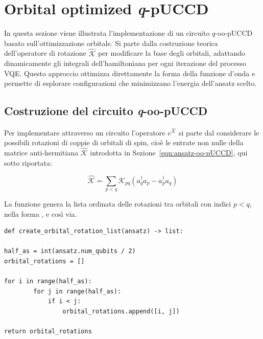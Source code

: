 \section{Orbital optimized \textit{q}-pUCCD}\label{sez:orbital-optimization}

In questa sezione viene illustrata l’implementazione di un circuito $q$-oo-pUCCD basato sull’ottimizzazione orbitale. Si parte dalla costruzione teorica dell’operatore di rotazione $\hat{\mathcal{K}}$ per modificare la base degli orbitali, adattando dinamicamente gli integrali dell'hamiltoniana per ogni iterazione del processo VQE. Questo approccio ottimizza direttamente la forma della funzione d’onda e permette di esplorare configurazioni che minimizzano l’energia dell’ansatz scelto. 

\subsection{Costruzione del circuito \textit{q}-oo-pUCCD}\label{subsec:costruzione-oo-pUCCD}

Per implementare attraverso un circuito l'operatore $e^{\hat{\mathcal{K}}}$ si parte dal considerare le possibili rotazioni di coppie di orbitali di spin, cioè le entrate non nulle della matrice anti-hermitiana $\hat{\mathcal{K}}$ introdotta in Sezione~\ref{eqn:ansatz-oo-pUCCD}, qui sotto riportata:

\begin{equation*}
    \hat{\mathcal{K}} = \sum_{p<q} \mathcal{K}_{pq} (a_{q}^{\dagger}a_{p} - a_{p}^{\dagger}a_{q})
\end{equation*}

La funzione  genera la lista ordinata delle rotazioni tra orbitali con indici $p<q$, nella forma \myinline{[0,1]}, \myinline{[0,2]} e così via.

\begin{tcolorbox}[title=Generazione lista di eccitazioni]
\begin{lstlisting}
def create_orbital_rotation_list(ansatz) -> list:

half_as = int(ansatz.num_qubits / 2)
orbital_rotations = []

for i in range(half_as):
        for j in range(half_as):
            if i < j:
                orbital_rotations.append([i, j])
                
return orbital_rotations
\end{lstlisting}
\vspace{-0.2cm}
\end{tcolorbox}

